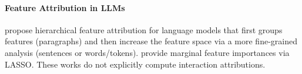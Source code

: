\vspace{-8pt}
\paragraph{Feature Attribution in LLMs}
\citet{enouen2023textgenshap, paes2024multi} propose hierarchical feature attribution for language models that first groups features (paragraphs) and then increase the feature space via a more fine-grained analysis (sentences or words/tokens). 
%
\citet{cohenwang2024contextciteattributingmodelgeneration} provide marginal feature importances via LASSO. 
%
These works do not explicitly compute interaction attributions. 






